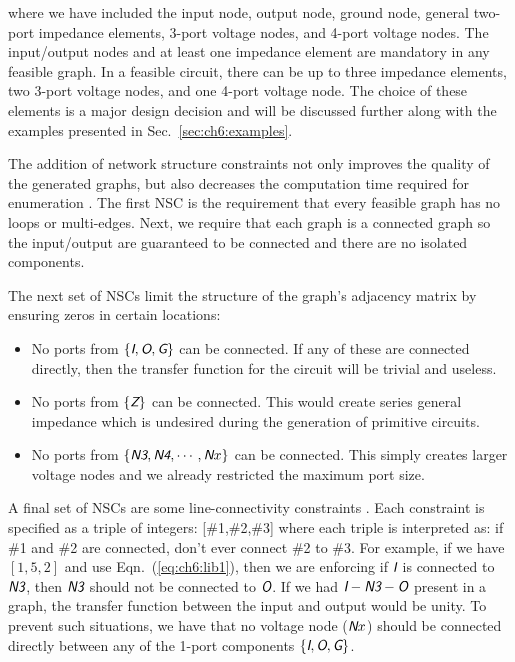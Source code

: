 \noindent where we have included the input node, output node, ground node, general two-port impedance elements, 3-port voltage nodes, and 4-port voltage nodes.
The input/output nodes and at least one impedance element are mandatory in any feasible graph.
In a feasible circuit, there can be up to three impedance elements, two 3-port voltage nodes, and one 4-port voltage node.
The choice of these elements is a major design decision and will be discussed further along with the examples presented in Sec.~\ref{sec:ch6:examples}.

The addition of network structure constraints not only improves the quality of the generated graphs, but also decreases the computation time required for enumeration \cite{Herber2017a, Herber2017d}.
The first NSC is the requirement that every feasible graph has no loops or multi-edges. Next, we require that each graph is a connected graph so the input/output are guaranteed to be connected and there are no isolated components.

The next set of NSCs limit the structure of the graph's adjacency matrix by ensuring zeros in certain locations:
\begin{itemize}
\item No ports from $\{ \textsl{\textsf{I}}, \textsl{\textsf{O}}, \textsl{\textsf{G}} \}$ can be connected. If any of these are connected directly, then the transfer function for the circuit will be trivial and useless.

\item No ports from $\{ \textsl{\textsf{Z}} \}$ can be connected. This would create series general impedance which is undesired during the generation of primitive circuits.

\item No ports from $\{ \textsl{\textsf{N3}}, \textsl{\textsf{N4}}, \cdots, \textsl{\textsf{N}}x \}$ can be connected. This simply creates larger voltage nodes and we already restricted the maximum port size.
\end{itemize}

A final set of NSCs are some line-connectivity constraints \cite{Herber2017d}. Each constraint is specified as a triple of integers: [\#1,\#2,\#3] where each triple is interpreted as: if \#1 and \#2 are connected, don't ever connect \#2 to \#3.
For example, if we have $[1,5,2]$ and use Eqn.~(\ref{eq:ch6:lib1}), then we are enforcing if $\textsl{\textsf{I}}$ is connected to $\textsl{\textsf{N3}}$, then $\textsl{\textsf{N3}}$ should not be connected to $\textsl{\textsf{O}}$.
If we had $\textsl{\textsf{I}} - \textsl{\textsf{N3}} - \textsl{\textsf{O}}$ present in a graph, the transfer function between the input and output would be unity.
To prevent such situations, we have that no voltage node ($\textsl{\textsf{N}}x$) should be connected directly between any of the 1-port components $\{\textsl{\textsf{I}}, \textsl{\textsf{O}}, \textsl{\textsf{G}} \}$.

